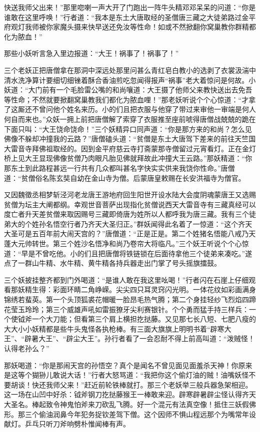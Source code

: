 \documentclass[12pt,UTF8]{ctexbook}
\begin{document}
{	快送我师父出来！”那里唿喇一声大开了门跑出一阵牛头精邓邓呆呆的问道：“你是谁敢在这里呼唤！”行者道：“我本是东土大唐取经的圣僧唐三藏之大徒弟路过金平府观灯我师被你家魔头摄来快早送还免汝等性命！如或不然掀翻你窝巢教你群精都化为脓血！”
	
	那些小妖听言急入里边报道：“大王！祸事了！祸事了！”
	
	三个老妖正把唐僧拿在那洞中深远处那里问甚么青红皂白教小的选剥了衣裳汲湍中清水洗净算计要细切细锉着酥合香油煎吃忽闻得报声“祸事”老大着惊问是何故。小妖道：“大门前有一个毛脸雷公嘴的和尚嚷道：大王摄了他师父来教快送出去免吾等性命；不然就要掀翻窝巢教我们都化为脓血哩！”那老妖听说个个心惊道：“才拿了这厮还不曾问他个姓名来历。小的们且把衣服与他穿了带过来审他一审端是何人何自而来也。”众妖一拥上前把唐僧解了索穿了衣服推至座前唬得唐僧战兢兢的跪在下面只叫：“大王饶命饶命！”三个妖精异口同声道：“你是那方来的和尚？怎么见佛像不躲却冲撞我的云路？”唐僧磕头道：“贫僧是东土大唐驾下差来的前往天竺国大雷音寺拜佛祖取经的。因到金平府慈云寺打斋蒙那寺僧留过元宵看灯。正在金灯桥上见大王显现佛像贫僧乃肉眼凡胎见佛就拜故此冲撞大王云路。”那妖精道：“你那东土到此路程甚远一行共有几众都叫甚名字快实实供来我饶你性命。”唐僧道：“贫僧俗名陈玄奘自幼在金山寺为僧。后蒙唐皇敕赐在长安洪福寺为僧官。
	
	又因魏徵丞相梦斩泾河老龙唐王游地府回生阳世开设水陆大会度阴魂蒙唐王又选赐贫僧为坛主大阐都纲。幸观世音菩萨出现指化贫僧说西天大雷音寺有三藏真经可以度亡者升天差贫僧来取因赐号三藏即倚唐为姓所以人都呼我为唐三藏。我有三个徒弟大的个姓孙名悟空行者乃齐天大圣归正。”群妖闻得此名着了一惊道：“这个齐天大圣可是五百年前大闹天宫的？”唐僧道：“正是正是。第二个姓猪名悟能八戒乃天蓬大元帅转世。第三个姓沙名悟净和尚乃卷帘大将临凡。”三个妖王听说个个心惊道：“早是不曾吃他。小的们且把唐僧将铁链锁在后面待拿他三个徒弟来凑吃。”遂点了一群山牛精、水牛精、黄牛精各持兵器走出门掌了号头摇旗擂鼓。
	
	三个妖披挂整齐都到门外喝道：“是谁人敢在我这里吆喝！”行者闪在石崖上仔细观看那妖精生得：彩面环睛二角峥嵘。尖尖四只耳灵窍闪光明。一体花纹如彩画满身锦绣若蜚英。第一个头顶狐裘花帽暖一脸昂毛热气腾；第二个身挂轻纱飞烈焰四蹄花莹玉玲玲；第三个威雄声吼如雷振獠牙尖利赛银针。个个勇而猛手持三样兵：一个使钺斧一个大刀能；但看第三个肩上横担扢挞藤。又见那七长八短、七肥八瘦的大大小小妖精都是些牛头鬼怪各执枪棒。有三面大旗旗上明明书着“辟寒大王”、“辟暑大王”、“辟尘大王”。孙行者看了一会忍耐不得上前高叫道：“泼贼怪！认得老孙么？”
	
	那妖喝道：“你是那闹天宫的孙悟空？真个是闻名不曾见面见面羞杀天神！你原来是这等个猢狲儿敢说大话！”行者大怒骂道：“我把你这个偷灯油的贼！油嘴妖怪不要胡谈！快还我师父来！”赶近前轮铁棒就打。那三个老妖举三般兵器急架相迎。这一场在山凹中好杀：钺斧钢刀扢挞藤猴王一棒敢来迎。辟寒辟暑辟尘怪认得齐天大圣名。棒起致令神鬼怕斧来刀砍乱飞腾。好一个混元有法真空像！抵住三妖假佛形。那三个偷油润鼻今年犯务捉钦差驾下僧。这个因师不惧山程远那个为嘴常年设献灯。乒乓只听刀斧响劈朴惟闻棒有声。
	
}
\end{document}

